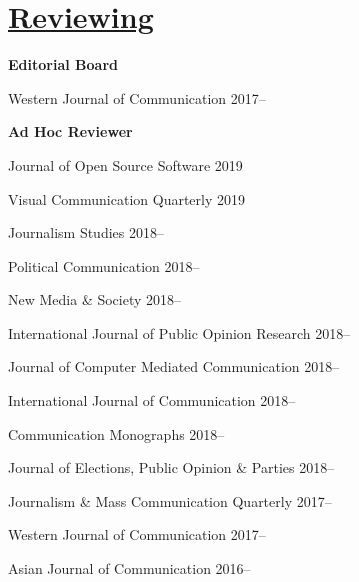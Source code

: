 \section{\href{https://publons.com/researcher/1596852/michael-w-kearney/peer-review/}{Reviewing}}

  \textbf{Editorial Board}
    \begin{innerlist}
      \item Western Journal of Communication                         \hfill 2017--
    \end{innerlist}\vspace{1em}

  \textbf{Ad Hoc Reviewer}
    \begin{innerlist}
      \item Journal of Open Source Software                          \hfill 2019
      \item Visual Communication Quarterly                           \hfill 2019
      \item Journalism Studies                                       \hfill 2018--
      \item Political Communication                                  \hfill 2018--
      \item New Media \& Society                                     \hfill 2018--
      \item International Journal of Public Opinion Research         \hfill 2018--
      \item Journal of Computer Mediated Communication               \hfill 2018--
      \item International Journal of Communication                   \hfill 2018--
      \item Communication Monographs                                 \hfill 2018--
      \item Journal of Elections, Public Opinion \& Parties          \hfill 2018--
      \item Journalism \& Mass Communication Quarterly               \hfill 2017--
      \item Western Journal of Communication                         \hfill 2017--
      \item Asian Journal of Communication                           \hfill 2016--
    \end{innerlist}\vspace{-.075in}
